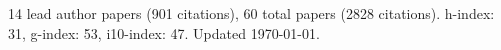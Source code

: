 14 lead author papers (901 citations),
60 total papers (2828 citations).\newline
h-index: 31, g-index: 53, i10-index: 47. Updated \today.